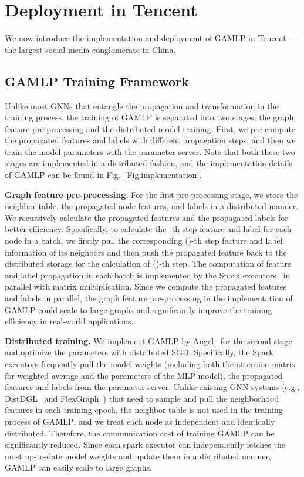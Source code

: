 \documentclass[sigconf]{acmart}
\newcommand{\sys}{\textsc{GAMLP}\xspace}
\begin{document}
\section{Deployment in Tencent}
We now introduce the implementation and deployment
of \sys in Tencent --- the largest social media conglomerate in China. 

\subsection{\sys Training Framework}
Unlike most GNNs that entangle the propagation and transformation in the training process, the training of \sys is separated into two stages: the graph feature pre-processing and the distributed model training.  
First, we pre-compute the propagated features and labels with different propagation steps, and then we train the model parameters with the parameter server. 
Note that both these two stages are implemented in a distributed fashion, and the implementation details of \sys can be found in Fig.~\ref{Fig.implementation}.

\noindent\textbf{Graph feature pre-processing.}
For the first pre-processing stage, we store the neighbor table, the propagated node features, and labels in a distributed manner. We recursively calculate the propagated features  and the propagated labels  for better efficiency. Specifically, to calculate the -th step feature and label for each node  in a batch, we firstly pull the corresponding ()-th step feature and label information of its neighbors and then push the propagated feature back to the distributed storage for the calculation of ()-th step. The computation of feature and label propagation in each batch is implemented by the Spark executors~\cite{zaharia2010spark} in parallel with matrix multiplication.
Since we compute the propagated features and labels in parallel, the graph feature pre-processing in the implementation of \sys could scale to large graphs and significantly improve the training efficiency in real-world applications.

\noindent\textbf{Distributed training.}
We implement \sys by Angel~\cite{jiang2020psgraph} for the second stage and optimize the parameters with distributed SGD. Specifically, the Spark executors frequently pull the model weights  (including both the attention matrix for weighted average and the parameters of the MLP model), the propagated features  and labels  from the parameter server.
Unlike existing GNN systems 
(e.g., DistDGL~\cite{distdgl_ai3_2020} and FlexGraph~\cite{wang2021flexgraph}) that need to sample and pull the neighborhood features in each training epoch, the neighbor table is not used in the training process of \sys, and we treat each node as independent and identically distributed. Therefore, the communication cost of training \sys can be significantly reduced. Since each spark executor can independently fetches the most up-to-date model weights  and update them in a distributed manner, \sys can easily scale to large graphs.
\end{document}
